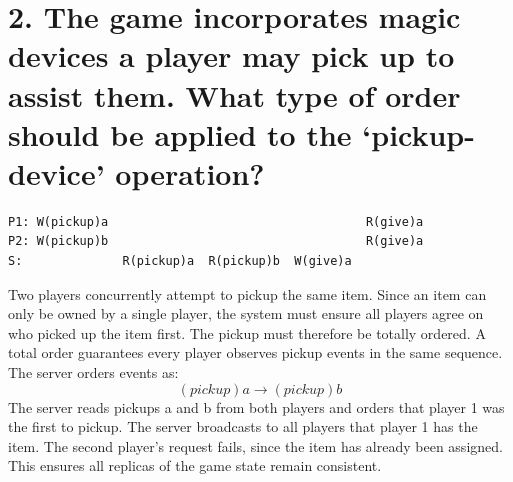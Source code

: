 \documentclass[a4paper,11pt]{article}
\begin{document}
\newpage
\section*{2. The game incorporates magic devices a player may pick up to assist them. What type of order should be applied to the ‘pickup-device’ operation?}
\begin{lstlisting}[caption=Total ordering of actions as seen by server and clients]
P1: W(pickup)a                                    R(give)a
P2: W(pickup)b                                    R(give)a
S:              R(pickup)a  R(pickup)b  W(give)a
\end{lstlisting}
Two players concurrently attempt to pickup the same item. Since an item can only be owned by a single player, the system must ensure all players agree on who picked up the item first. The pickup must therefore be totally ordered. A total order guarantees every player observes pickup events in the same sequence. The server orders events as:
\[
(pickup)a \rightarrow (pickup)b
\]
The server reads pickups a and b from both players and orders that player 1 was the first to pickup. The server broadcasts to all players that player 1 has the item. The second player's request fails, since the item has already been assigned. This ensures all replicas of the game state remain consistent.
\end{document}
